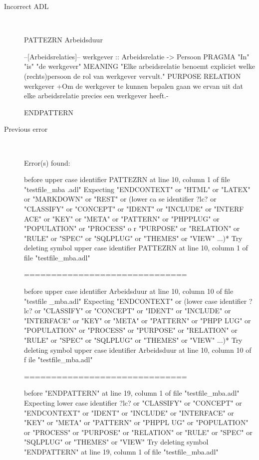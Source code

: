 \hrulefill

\begin{description}
  \item[Incorrect ADL]~\\
\begin{adl}
PATTEZRN Arbeidsduur

--[Arbeidsrelaties]--
werkgever :: Arbeidsrelatie -> Persoon
PRAGMA "In" "is" "de werkgever"
MEANING "Elke arbeidsrelatie benoemt expliciet welke (rechts)persoon de rol van werkgever vervult."
PURPOSE RELATION werkgever
{+Om de werkgever te kunnen bepalen gaan we ervan uit dat elke arbeidsrelatie precies een werkgever heeft.-}

ENDPATTERN\end{adl}
  \item[Previous error]~\\
\begin{haskell}
Error(s) found:

before upper case identifier PATTEZRN at line 10, column 1 of file "testfile_mba
.adl"
Expecting "ENDCONTEXT" or "HTML" or "LATEX" or "MARKDOWN" or "REST" or (lower ca
se identifier ?lc? or "CLASSIFY" or "CONCEPT" or "IDENT" or "INCLUDE" or "INTERF
ACE" or "KEY" or "META" or "PATTERN" or "PHPPLUG" or "POPULATION" or "PROCESS" o
r "PURPOSE" or "RELATION" or "RULE" or "SPEC" or "SQLPLUG" or "THEMES" or "VIEW"
 ...)*
Try deleting symbol upper case identifier PATTEZRN at line 10, column 1 of file
"testfile_mba.adl"

==============================

before upper case identifier Arbeidsduur at line 10, column 10 of file "testfile
_mba.adl"
Expecting "ENDCONTEXT" or (lower case identifier ?lc? or "CLASSIFY" or "CONCEPT"
 or "IDENT" or "INCLUDE" or "INTERFACE" or "KEY" or "META" or "PATTERN" or "PHPP
LUG" or "POPULATION" or "PROCESS" or "PURPOSE" or "RELATION" or "RULE" or "SPEC"
 or "SQLPLUG" or "THEMES" or "VIEW" ...)*
Try deleting symbol upper case identifier Arbeidsduur at line 10, column 10 of f
ile "testfile_mba.adl"

==============================

before "ENDPATTERN" at line 19, column 1 of file "testfile_mba.adl"
Expecting lower case identifier ?lc? or "CLASSIFY" or "CONCEPT" or "ENDCONTEXT"
or "IDENT" or "INCLUDE" or "INTERFACE" or "KEY" or "META" or "PATTERN" or "PHPPL
UG" or "POPULATION" or "PROCESS" or "PURPOSE" or "RELATION" or "RULE" or "SPEC"
or "SQLPLUG" or "THEMES" or "VIEW"
Try deleting symbol "ENDPATTERN" at line 19, column 1 of file "testfile_mba.adl"


\end{haskell}
\end{description}

